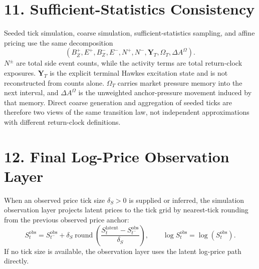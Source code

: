 \documentclass[11pt]{article}
\begin{document}
    \section*{11. Sufficient-Statistics Consistency}
    Seeded tick simulation, coarse simulation, sufficient-statistics sampling,
    and affine pricing use the same decomposition
    \[
        (B_Z^+,E^+,B_Z^-,E^-,
        N^+,N^-,\mathbf Y_T,\Omega_T,\Delta A^\Omega).
    \]
    \(N^\pm\) are total side event counts, while the activity terms are total
    return-clock exposures.
    \(\mathbf Y_T\) is the explicit terminal Hawkes excitation state and is not
    reconstructed from counts alone.
    \(\Omega_T\) carries market pressure memory into the next interval,
    and \(\Delta A^\Omega\) is the unweighted anchor-pressure movement induced
    by that memory.
    Direct coarse generation and aggregation of seeded ticks are therefore two
    views of the same transition law, not independent approximations with
    different return-clock definitions.

    \section*{12. Final Log-Price Observation Layer}
    When an observed price tick size \(\delta_S>0\) is supplied or inferred, the
    simulation observation layer projects latent prices to the tick grid by
    nearest-tick rounding from the previous observed price anchor:
    \[
        S_t^{\mathrm{obs}}
        =
        S_{t^-}^{\mathrm{obs}}
        +
        \delta_S
        \operatorname{round}\!\left(
            \frac{S_t^{\mathrm{latent}}-S_{t^-}^{\mathrm{obs}}}{\delta_S}
        \right),
        \qquad
        \log S_t^{\mathrm{obs}}=\log(S_t^{\mathrm{obs}}).
    \]
    If no tick size is available, the observation layer uses the latent log-price
    path directly.
\end{document}
